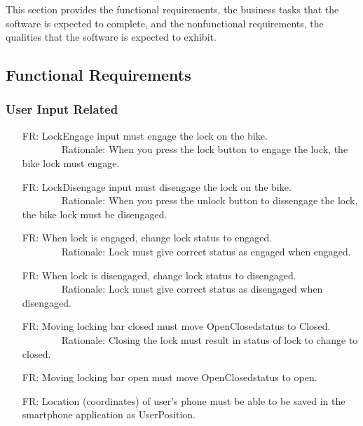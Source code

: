 \documentclass[12pt]{article}
\newcounter{reqnum} %
\begin{document}
This section provides the functional requirements, the business tasks that the
software is expected to complete, and the nonfunctional requirements, the
qualities that the software is expected to exhibit.

\subsection{Functional Requirements}

\subsubsection{User Input Related}
\begin{itemize}
\setlength{\itemindent}{.5in}
\item[FR\refstepcounter{reqnum}\thereqnum\label{FR1}:] LockEngage input must engage the lock on the bike.
\\ \-\ \-\ \-\ \-\ \-\ \-\ \-\ \-\ Rationale: When you press the lock button to engage the lock, the bike lock must engage.
\item[FR\refstepcounter{reqnum}\thereqnum\label{FR2}:] LockDisengage input must disengage the lock on the bike.
\\ \-\ \-\ \-\ \-\ \-\ \-\ \-\ \-\ Rationale: When you press the unlock button to dissengage the lock, the bike lock must be disengaged.
\item[FR\refstepcounter{reqnum}\thereqnum\label{FR3}:] When lock is engaged, change lock status to engaged.
\\ \-\ \-\ \-\ \-\ \-\ \-\ \-\ \-\ Rationale: Lock must give correct status as engaged when engaged.
\item[FR\refstepcounter{reqnum}\thereqnum\label{FR4}:] When lock is disengaged, change lock status to disengaged.
\\ \-\ \-\ \-\ \-\ \-\ \-\ \-\ \-\ Rationale: Lock must give correct status as disengaged when disengaged.
\item[FR\refstepcounter{reqnum}\thereqnum\label{FR5}:] Moving locking bar closed must move OpenClosedstatus to Closed.
\\ \-\ \-\ \-\ \-\ \-\ \-\ \-\ \-\ Rationale: Closing the lock must result in status of lock to change to closed.
\item[FR\refstepcounter{reqnum}\thereqnum\label{FR6}:] Moving locking bar open must move OpenClosedstatus to open.
\item[FR\refstepcounter{reqnum}\thereqnum\label{FR7}:] Location (coordinates) of user’s phone must be able to be saved in the smartphone application as UserPosition.

\end{itemize}
\end{document}
